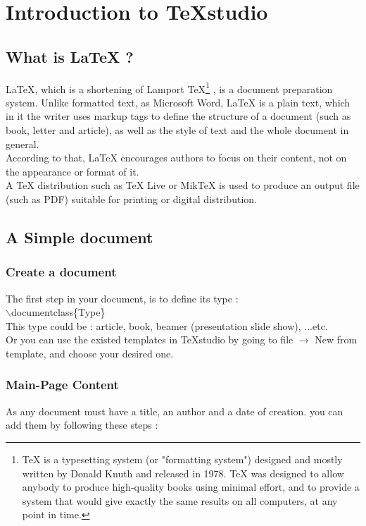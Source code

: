 \chapter{Introduction to TeXstudio}

\section{What is LaTeX ?}

\huge LaTeX, \normalsize {which is a shortening of Lamport TeX\footnote[1]{ TeX is a typesetting system (or "formatting system") designed and mostly written by Donald Knuth and released in 1978. TeX was designed to allow anybody to produce high-quality books using minimal effort, and to provide a system that would give exactly the same results on all computers, at any point in time.}
	, is a document preparation system. Unlike formatted text, as Microsoft Word, LaTeX is a plain text, which in it the writer uses markup tags to define the structure of a document (such as book, letter and article), as well as the style of text and the whole document in general.
\\According to that, LaTeX encourages authors to focus on their content, not on the appearance or format of it.
\\A TeX distribution such as TeX Live or MikTeX is used to produce an output file (such as PDF) suitable for printing or digital distribution.}

\clearpage

\section{A Simple document}

\subsection{Create a document}
The first step in your document, is to define its type : \\
$\backslash$documentclass\{Type\}
\\This type could be : article, book, beamer (presentation slide show), ...etc.
\\Or you can use the existed templates in TeXstudio by going to file $\rightarrow$ New from template, and choose your desired one.

\subsection{Main-Page Content}
As any document must have a title, an author and a date of creation. you can add them by following these steps :
\\

